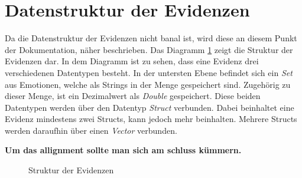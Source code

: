 \section{Datenstruktur der Evidenzen}
Da die Datenstruktur der Evidenzen nicht banal ist, wird diese an diesem Punkt der Dokumentation, näher beschrieben. Das Diagramm \ref{diagramm_evidenzen} zeigt die Struktur der Evidenzen dar. In dem Diagramm ist zu sehen, dass eine Evidenz drei verschiedenen Datentypen besteht. In der untersten Ebene befindet sich ein \textit{Set} aus Emotionen, welche als Strings in der Menge gespeichert sind. Zugehörig zu dieser Menge, ist ein Dezimalwert als \textit{Double} gespeichert. Diese beiden Datentypen werden über den Datentyp \textit{Struct} verbunden. Dabei beinhaltet eine Evidenz mindestens zwei Structs, kann jedoch mehr beinhalten. Mehrere Structs werden daraufhin über einen \textit{Vector} verbunden.

\textbf{Um das allignment sollte man sich am schluss kümmern.}
\begin{figure}
\centering
\caption{Struktur der Evidenzen}
\label{diagramm_evidenzen}
\end{figure}


